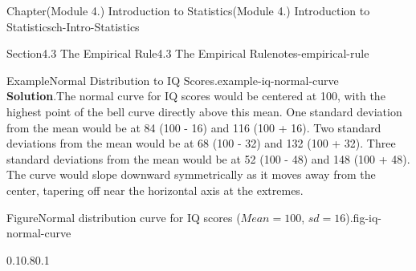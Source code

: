 \documentclass[oneside,10pt,]{book}
\newcommand{\blocktitlefont}{\relax}
\begin{document}
\begin{chapterptx}{Chapter}{(Module 4.) Introduction to Statistics}{}{(Module 4.) Introduction to Statistics}{}{}{ch-Intro-Statistics}
\begin{sectionptx}{Section}{4.3 The Empirical Rule}{}{4.3 The Empirical Rule}{}{}{notes-empirical-rule}
\begin{example}{Example}{Normal Distribution to IQ Scores.}{example-iq-normal-curve}
\noindent\textbf{\blocktitlefont Solution}.\hypertarget{example-iq-normal-curve-3}{}\quad{}The normal curve for IQ scores would be centered at 100, with the highest point of the bell curve directly above this mean. One standard deviation from the mean would be at 84 (100 - 16) and 116 (100 + 16). Two standard deviations from the mean would be at 68 (100 - 32) and 132 (100 + 32). Three standard deviations from the mean would be at 52 (100 - 48) and 148 (100 + 48). The curve would slope downward symmetrically as it moves away from the center, tapering off near the horizontal axis at the extremes.%
\begin{figureptx}{Figure}{Normal distribution curve for IQ scores (\(Mean = 100\), \(sd = 16\)).}{fig-iq-normal-curve}{}%
\begin{image}{0.1}{0.8}{0.1}{}%
\end{image}
\end{figureptx}
\end{example}
\end{sectionptx}
\end{chapterptx}
\end{document}
